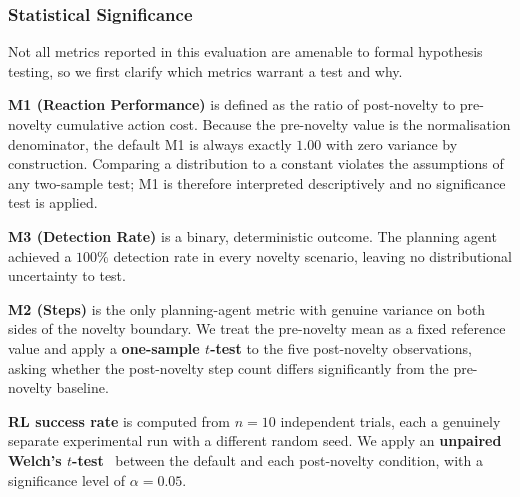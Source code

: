 
\subsubsection{Statistical Significance}
\label{sec:statistical_significance}

Not all metrics reported in this evaluation are amenable to formal hypothesis
testing, so we first clarify which metrics warrant a test and why.

\textbf{M1 (Reaction Performance)} is defined as the ratio of post-novelty to
pre-novelty cumulative action cost. Because the pre-novelty value is the
normalisation denominator, the default M1 is always exactly $1.00$ with zero
variance by construction. Comparing a distribution to a constant violates the
assumptions of any two-sample test; M1 is therefore interpreted descriptively
and no significance test is applied.

\textbf{M3 (Detection Rate)} is a binary, deterministic outcome. The planning
agent achieved a $100\%$ detection rate in every novelty scenario, leaving no
distributional uncertainty to test.

\textbf{M2 (Steps)} is the only planning-agent metric with genuine variance on
both sides of the novelty boundary. We treat the pre-novelty mean as a fixed
reference value and apply a \textbf{one-sample $t$-test} to the five
post-novelty observations, asking whether the post-novelty step count differs
significantly from the pre-novelty baseline.

\textbf{RL success rate} is computed from $n = 10$ independent trials, each a
genuinely separate experimental run with a different random seed. We apply an
\textbf{unpaired Welch's $t$-test}~\cite{kim2015t} between the default and each
post-novelty condition, with a significance level of $\alpha = 0.05$.

